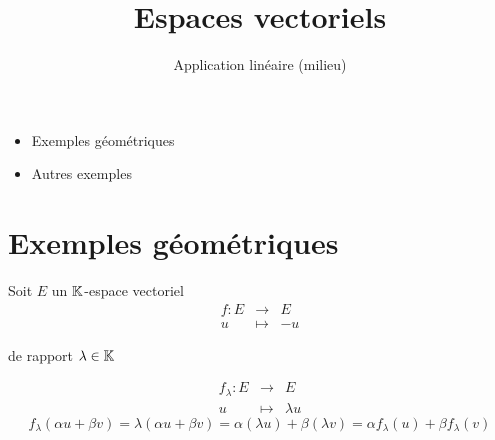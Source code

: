 





\title{{\bf Espaces vectoriels}}
\subtitle{Application linéaire (milieu)}

\begin{frame}
  
  \debutmontitre

  \pause

{\footnotesize
\hfill
{}
\begin{minipage}{0.6\textwidth}
  \begin{itemize}
    \item<3-> Exemples géométriques
    \item<4-> Autres exemples    
  \end{itemize}
\end{minipage}
}

\end{frame}

\setcounter{framenumber}{0}



\section{Exemples géométriques}

\begin{frame}

Soit $E$ un $\mathbb{K}$-espace vectoriel
$$\begin{array}{rcl}
f : E & \to & E \\
u & \mapsto & - u
  \end{array}$$
  

 


 de rapport $\lambda \in \mathbb{K}$

$$\begin{array}{rcl}
f_{\lambda} : E & \to & E \\
u & \mapsto & \lambda u
  \end{array}$$
\pause
$$
f_{\lambda}(\alpha u + \beta v) 
= \lambda (\alpha u + \beta v) 
= \alpha (\lambda u)+ \beta (\lambda v) 
= \alpha f_{\lambda}(u) +\beta f_{\lambda}(v)
$$
\end{frame}

